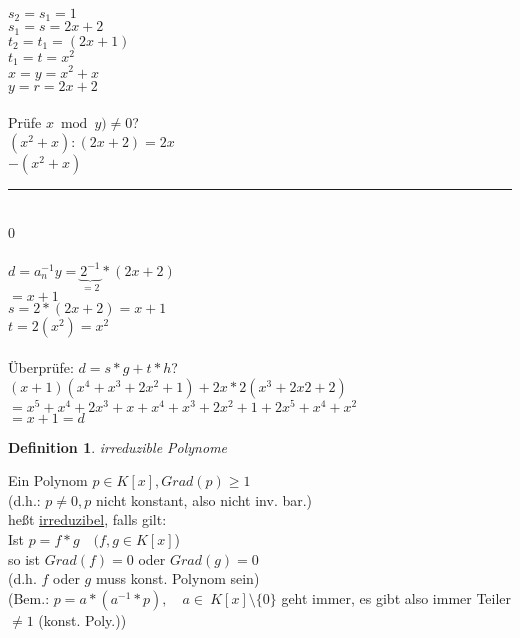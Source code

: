 \documentclass[a4paper,11pt]{article}
\newtheorem{definition}{Definition}[section]
\begin{document}
\newpage

$s_2=s_1=1$ \\
$s_1=s=2x+2$ \\
$t_2=t_1=(2x+1)$ \\
$t_1=t=x^2$ \\
$x=y=x^2+x$ \\
$y=r=2x+2$ \\
\\
Prüfe $x\bmod y)\neq0$? \\
$(x^2+x):(2x+2)=2x$ \\
$-(x^2+x)$ \\
\rule{3cm}{1pt} \\
0 \\
\\
$d=a^{-1}_ny=\underbrace{2^{-1}}_{=2}*(2x+2)$ \\
$=x+1$ \\
$s=2*(2x+2)=x+1$ \\
$t=2(x^2)=x^2$ \\
\\
Überprüfe: $d=s*g+t*h$? \\
$(x+1)(x^4+x^3+2x^2+1)+2x*2(x^3+2x2+2)$ \\
$=x^5+x^4+2x^3+x+x^4+x^3+2x^2+1+2x^5+x^4+x^2$ \\
$=x+1=d$

\begin{definition}
	irreduzible Polynome
\end{definition}
Ein Polynom $p\in K[x], Grad(p)\geq1$ \\
(d.h.: $p\neq0,p$ nicht konstant, also nicht inv. bar.) \\
heßt \underline{irreduzibel}, falls gilt: \\
Ist $p=f*g\quad (f,g\in K[x]$) \\
so ist $Grad(f)=0$ oder $Grad(g)=0$ \\
(d.h. $f$ oder $g$ muss konst. Polynom sein) \\
(Bem.: $p=a*(a^{-1}*p),\quad a\in\ K[x]\setminus\{0\}$ geht immer, es gibt also immer Teiler $\neq1$ (konst. Poly.))
\end{document}
